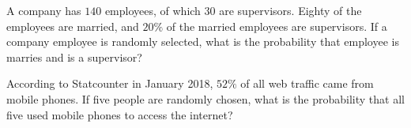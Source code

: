 \documentclass[12pt, letterpaper]{article}
\newcounter{exercise}
\theoremstyle{definition}
\begin{document}
\begin{exercise}
A company has $140$ employees, of which $30$ are supervisors.  Eighty of the employees are married, and $20\%$ of the married employees are supervisors.  If a company employee is randomly selected, what is the probability that employee is marries and is a supervisor?
\end{exercise}

\vfill
\vfill

\begin{exercise}
According to Statcounter in January 2018, $52\%$ of all web traffic came from mobile phones.  If five people are randomly chosen, what is the probability that all five used mobile phones to access the internet?
\end{exercise}

\vfill
\end{document}

